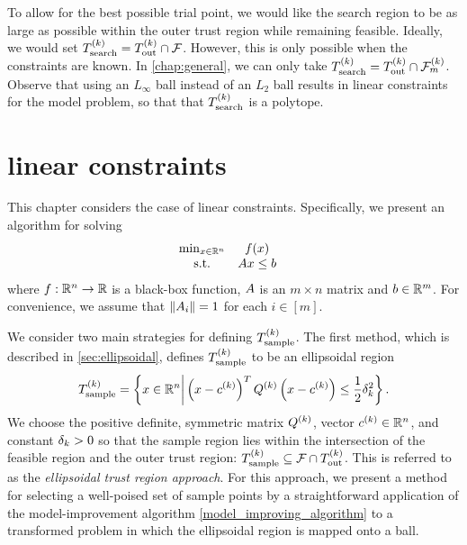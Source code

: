 \documentclass{article}
\begin{document}
To allow for the best possible trial point, we would like the search region to be as large as possible within the outer trust region while remaining feasible.
Ideally, we would set ${T_{\text{search}}^{(k)}}={T_{\text{out}}^{(k)}} \cap {\mathcal F}$.
However, this is only possible when the constraints are known.
In \cref{chap:general}, we can only take ${T_{\text{search}}^{(k)}} = {T_{\text{out}}^{(k)}} \cap {\mathcal F_m^{(k)}}$.
Observe that using an $L_{\infty}$ ball instead of an $L_2$ ball results in linear constraints for the model problem,
so that that ${T_{\text{search}}^{(k)}}$ is a polytope.


\section{linear constraints}
\label{sec:linear}
This chapter considers the case of linear constraints.
Specifically, we present an algorithm for solving
\begin{align}
\label{eq:DFO-linear}
\begin{array}{ccl} \min_{x \in \mathbb R^n} & f(x) \\
\textrm{s.t.} & {A} x \le {b} & 
\end{array}
\end{align}
where $f:\mathbb R^n\rightarrow\mathbb R$ is a black-box function, 
${A}$ is an $m \times n$ matrix and ${b} \in \mathbb R^m$.
For convenience, we assume that $\left\|{A}_i\right\| = 1$ for each $i \in [m]$.

We consider two main strategies for defining ${T_{\text{sample}}^{(k)}}$.
The first method,  which is described in \cref{sec:ellipsoidal},  
defines ${T_{\text{sample}}^{(k)}}$ to be an ellipsoidal region
\begin{align}
\label{define_the_sample_region}
{T_{\text{sample}}^{(k)}} = \left\{x \in \mathbb R^n \bigg | \left(x - c^{(k)}\right)^T {Q^{(k)}} \left(x - c^{(k)}\right) \le \frac 1 2 \delta_k^2 \right\}.
\end{align}
We choose the positive definite, symmetric matrix ${Q^{(k)}}$, vector $c^{(k)} \in \mathbb R^n$, and constant $\delta_k > 0$ so that
the sample region lies within the intersection of the feasible region and the outer trust region:
${T_{\text{sample}}^{(k)}} \subseteq {\mathcal F} \cap {T_{\text{out}}^{(k)}}$.
This is referred to as the {\em ellipsoidal trust region approach}.
For this approach, we present a method for selecting a well-poised set of sample points by a straightforward application 
of the model-improvement algorithm \cref{model_improving_algorithm} to a transformed problem in which 
the ellipsoidal region is mapped onto a ball.
\end{document}
